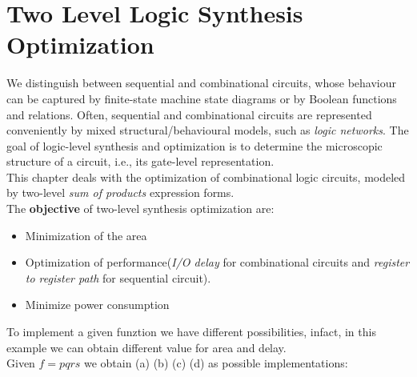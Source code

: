 \section{Two Level Logic Synthesis Optimization}
We distinguish between sequential and combinational circuits, whose behaviour can be captured by finite-state machine state diagrams or by Boolean functions and relations. Often, sequential and combinational circuits are represented conveniently by mixed structural/behavioural models, such as  \textit{logic networks}. The goal of logic-level synthesis and optimization is to determine the microscopic structure of a circuit, i.e., its gate-level representation. \\
This chapter deals with the optimization of combinational logic circuits, modeled by two-level  \textit{sum of products}  expression forms.	
\bigskip\\
The \textbf{objective} of two-level synthesis optimization are:
\begin{itemize}
	\item Minimization of the area
	\item Optimization of performance(\textit{I/O delay} for combinational circuits and \textit{register to register path} for sequential circuit).
	\item Minimize power consumption
\end{itemize}
\bigskip
To implement a given funztion we have different possibilities, infact, in this example we can obtain different value for area and delay.\\
Given $ f = pqrs $ we obtain (a) (b) (c) (d) as possible implementations:
